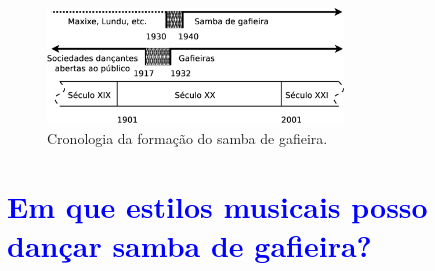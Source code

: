 \begin{figure}[h]
  \centering
    \includegraphics[width=0.7\textwidth]{chapters/cap-historia-sambagafieira/gafieira-crono.eps}
  \caption{ Cronologia da formação do samba de gafieira.}
\label{fig:sambagafieiracrono}
\end{figure}

\section{\textcolor{blue}{Em que estilos musicais posso dançar samba de gafieira?}}
\label{subsec:gafieiradancaestilos}

